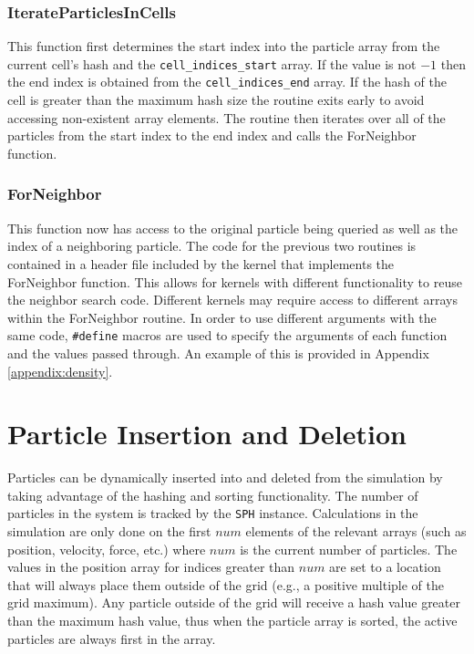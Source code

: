 \subsubsection{IterateParticlesInCells}
This function first determines the start index into the particle array from the
current cell's hash and the \verb|cell_indices_start| array. If the value is
not $-1$ then the end index is obtained from the \verb|cell_indices_end| array.
If the hash of the cell is greater than the maximum hash size the routine exits
early to avoid accessing non-existent array elements. The routine then iterates
over all of the particles from the start index to the end index and calls the
ForNeighbor function.

\subsubsection{ForNeighbor}
This function now has access to the original particle being queried as well as
the index of a neighboring particle. The code for the previous two routines is
contained in a header file included by the kernel that implements the
ForNeighbor function. This allows for kernels with different functionality to
reuse the neighbor search code. Different kernels may require access to
different arrays within the ForNeighbor routine. In order to use different
arguments with the same code, \verb|#define| macros are used to specify
the arguments of each function and the values passed through. An example of
this is provided in Appendix \ref{appendix:density}.

\section{Particle Insertion and Deletion}
Particles can be dynamically inserted into and deleted from the simulation by
taking advantage of the hashing and sorting functionality. The number of
particles in the system is tracked by the \verb|SPH| instance.
Calculations in the simulation are only done on the first $num$ elements of the
relevant arrays (such as position, velocity, force, etc.) where $num$ is the
current number of particles. The values in the position array for indices
greater than $num$ are set to a location that will always place them outside of
the grid (e.g., a positive multiple of the grid maximum). Any particle outside of
the grid will receive a hash value greater than the maximum hash value, thus
when the particle array is sorted, the active particles are always first in the
array. 

